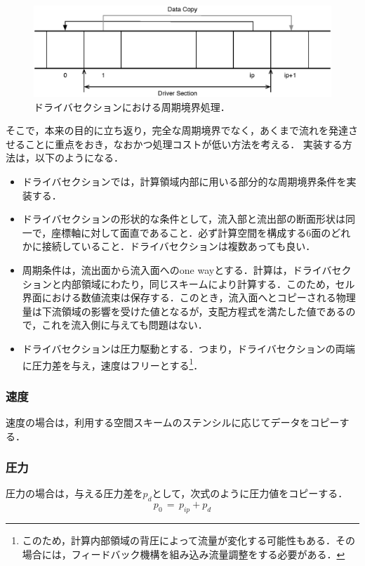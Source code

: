 \begin{figure}[htbp]
\begin{center}
\includegraphics[width=13cm,clip]{Driver_prdc.eps}
\end{center}
\caption{ドライバセクションにおける周期境界処理．}
\label{fig:Driver_prdc}
\end{figure}

そこで，本来の目的に立ち返り，完全な周期境界でなく，あくまで流れを発達させることに重点をおき，なおかつ処理コストが低い方法を考える．
実装する方法は，以下のようになる．
\begin{itemize}
\item ドライバセクションでは，計算領域内部に用いる部分的な周期境界条件を実装する．
\item ドライバセクションの形状的な条件として，流入部と流出部の断面形状は同一で，座標軸に対して面直であること．必ず計算空間を構成する6面のどれかに接続していること．ドライバセクションは複数あっても良い．
\item 周期条件は，流出面から流入面へのone wayとする．計算は，ドライバセクションと内部領域にわたり，同じスキームにより計算する．このため，セル界面における数値流束は保存する．このとき，流入面へとコピーされる物理量は下流領域の影響を受けた値となるが，支配方程式を満たした値であるので，これを流入側に与えても問題はない．
\item ドライバセクションは圧力駆動とする．つまり，ドライバセクションの両端に圧力差を与え，速度はフリーとする\footnote{このため，計算内部領域の背圧によって流量が変化する可能性もある．その場合には，フィードバック機構を組み込み流量調整をする必要がある．}．
\end{itemize}

\subsubsection{速度}
速度の場合は，利用する空間スキームのステンシルに応じてデータをコピーする．

\subsubsection{圧力}
圧力の場合は，与える圧力差を$p_d$として，次式のように圧力値をコピーする．
\begin{equation}
p_0 \,=\, p_{ip} + p_d
\end{equation}

